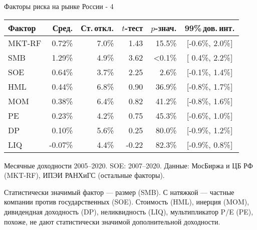 \documentclass{beamer}
\begin{document}
\begin{frame}{Факторы риска на рынке России - 4}
\centering
\begin{tabular}{l|r|r|r|r|c}
Фактор & Сред. & Ст.\,откл. & $t$-тест & $p$-знач. & 99\%\,дов.\,инт. \\
\hline
MKT-RF  &  0.72\% & 7.0\% &  1.43 & 15.5\% & [-0.6\%, 2.0\%] \\
SMB     &  1.29\% & 4.9\% &  3.62 & <0.1\% & [ 0.4\%, 2.2\%] \\ 
SOE     &  0.64\% & 3.7\% &  2.25 &  2.6\% & [-0.1\%, 1.4\%] \\
HML     &  0.44\% & 6.8\% &  0.90 & 36.9\% & [-0.8\%, 1.7\%] \\
MOM     &  0.38\% & 6.4\% &  0.82 & 41.2\% & [-0.8\%, 1.6\%] \\  
PE      &  0.23\% & 4.2\% &  0.75 & 45.3\% & [-0.6\%, 1.0\%] \\
DP      &  0.10\% & 5.6\% &  0.25 & 80.0\% & [-0.9\%, 1.2\%] \\
LIQ     & -0.07\% & 4.4\% & -0.22 & 82.3\% & [-0.9\%, 0.8\%] \\ \hline
\end{tabular}

\justify
{\scriptsize Месячные доходности 2005--2020. SOE: 2007--2020. Данные: МосБиржа и ЦБ РФ (MKT-RF), ИПЭИ РАНХиГС (остальные факторы).}

\justify
Статистически значимый фактор --- размер (SMB). С натяжкой ---  частные компании против государственных (SOE). Стоимость (HML), инерция (MOM), дивидендная доходность (DP), неликвидность (LIQ), мультипликатор P/E (PE), похоже, не дают статистически значимой дополнительной доходности.
\end{frame}
\end{document}
